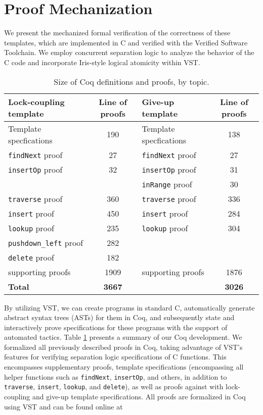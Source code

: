 \documentclass[a4paper,UKenglish,cleveref, autoref, thm-restate]{lipics-v2021}
\begin{document}
\section{Proof Mechanization}
\label{proof_mech}
We present the mechanized formal verification of the correctness of these templates, which are implemented in C and verified with the Verified Software Toolchain. We employ concurrent separation logic to analyze the behavior of the C code and incorporate Iris-style logical atomicity within VST.

\begin{table}[h]
	\begin{center}
		\begin{tabular}{l | c || l | c } 
			\hline
			\textbf{Lock-coupling template} & \textbf{Line of proofs} & \textbf{Give-up  template} & \textbf{Line of proofs} \\
			\hline
			Template specfications & 190 & Template specfications & 138 \\
			\texttt{findNext} proof 	& 27  & \texttt{findNext} proof & 27 \\
			\texttt{insertOp} proof 	& 32  & \texttt{insertOp} proof & 31 \\
			& & \texttt{inRange} proof & 30 \\
			\texttt{traverse} proof	& 360  & \texttt{traverse} proof & 336 \\ 
			\texttt{insert} proof 	   		& 450  & \texttt{insert} proof & 284 \\
			\texttt{lookup} proof 	   	& 235  &  \texttt{lookup} proof & 304 \\ 
			\texttt{pushdown\_left} proof 	   	& 282 & & \\	
			\texttt{delete} proof 		& 182	 &   & 	 \\
			supporting proofs    & 	1909	 & supporting proofs 	& 1876 \\
			\hline
			\textbf{Total} & \textbf{3667} & & \textbf{3026}  
		\end{tabular}
		\caption{Size of Coq definitions and proofs, by topic.}
		\label{table_coq}
	\end{center}
\end{table}

By utilizing VST, we can create programs in standard C, automatically generate abstract syntax trees (ASTs) for them in Coq, and subsequently state and interactively prove specifications for these programs with the support of automated tactics. Table \ref{table_coq} presents a summary of our Coq development. We formalized all previously described proofs in Coq, taking advantage of VST's features for verifying separation logic specifications of C functions. This encompasses supplementary proofs, template specifications (encompassing all helper functions such as \texttt{findNext}, \texttt{insertOp}, and others, in addition to \texttt{traverse}, \texttt{insert}, \texttt{lookup}, and \texttt{delete}), as well as proofs against with lock-coupling and give-up template specifications. All proofs are formalized in Coq using VST and can be found online at
\end{document}
